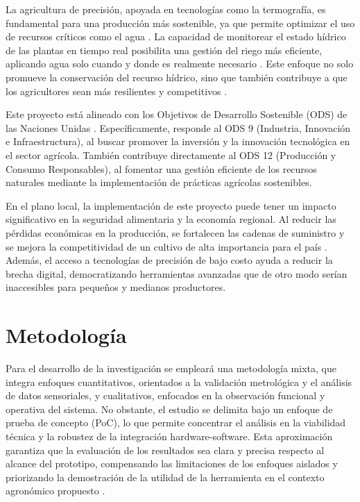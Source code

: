 La agricultura de precisión, apoyada en tecnologías como la termografía, es fundamental para una producción más sostenible, ya que permite optimizar el uso de recursos críticos como el agua . La capacidad de monitorear el estado hídrico de las plantas en tiempo real posibilita una gestión del riego más eficiente, aplicando agua solo cuando y donde es realmente necesario . Este enfoque no solo promueve la conservación del recurso hídrico, sino que también contribuye a que los agricultores sean más resilientes y competitivos .

Este proyecto está alineado con los Objetivos de Desarrollo Sostenible (ODS) de las Naciones Unidas . Específicamente, responde al ODS 9 (Industria, Innovación e Infraestructura), al buscar promover la inversión y la innovación tecnológica en el sector agrícola. También contribuye directamente al ODS 12 (Producción y Consumo Responsables), al fomentar una gestión eficiente de los recursos naturales mediante la implementación de prácticas agrícolas sostenibles.

En el plano local, la implementación de este proyecto puede tener un impacto significativo en la seguridad alimentaria y la economía regional. Al reducir las pérdidas económicas en la producción, se fortalecen las cadenas de suministro y se mejora la competitividad de un cultivo de alta importancia para el país . Además, el acceso a tecnologías de precisión de bajo costo ayuda a reducir la brecha digital, democratizando herramientas avanzadas que de otro modo serían inaccesibles para pequeños y medianos productores.

\section{Metodología}
\label{sec:metodologia}

Para el desarrollo de la investigación se empleará una metodología mixta, que integra enfoques cuantitativos, orientados a la validación metrológica y el análisis de datos sensoriales, y cualitativos, enfocados en la observación funcional y operativa del sistema. No obstante, el estudio se delimita bajo un enfoque de prueba de concepto (PoC), lo que permite concentrar el análisis en la viabilidad técnica y la robustez de la integración hardware-software. Esta aproximación garantiza que la evaluación de los resultados sea clara y precisa respecto al alcance del prototipo, compensando las limitaciones de los enfoques aislados y priorizando la demostración de la utilidad de la herramienta en el contexto agronómico propuesto .

